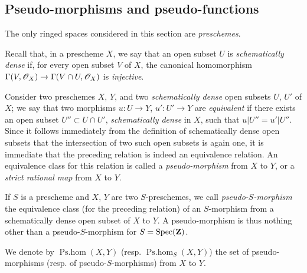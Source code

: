 \subsection{Pseudo-morphisms and pseudo-functions}

The only ringed spaces considered in this section are \emph{preschemes}.

\begin{env}[20.2.1]\label{IV.20.2.1}
Recall  that, in a prescheme $X$, we say that an open subset $U$ is \emph{schematically dense} if, for every open subset $V$ of $X$, the canonical homomorphism $\Gamma(V,\mathscr{O}_X)\to\Gamma(V\cap U,\mathscr{O}_X)$ is \emph{injective}.

Consider two preschemes $X$, $Y$, and two \emph{schematically dense} open subsets $U$, $U'$ of $X$; we say that two morphisms $u:U\to Y$, $u':U'\to Y$ are \emph{equivalent} if there exists an open subset $U''\subset U\cap U'$, \emph{schematically dense} in $X$, such that $u|U''=u'|U''$.
Since it follows immediately from the definition of schematically dense open subsets that the intersection of two such open subsets is again one, it is immediate that the preceding relation is indeed an equivalence relation.
An equivalence class for this relation is called a \emph{pseudo-morphism} from $X$ to $Y$, or a \emph{strict rational map} from $X$ to $Y$.

If $S$ is a prescheme and $X$, $Y$ are two $S$-preschemes, we call \emph{pseudo-$S$-morphism} the equivalence class (for the preceding relation) of an $S$-morphism from a schematically dense open subset of $X$ to $Y$.
A pseudo-morphism is thus nothing other than a pseudo-$S$-morphism for $S=\operatorname{Spec}(\mathbf{Z})$.

We denote by $\operatorname{Ps.hom}(X,Y)$ (resp. $\operatorname{Ps.hom}_S(X,Y)$) the set of pseudo-morphisms (resp. of pseudo-$S$-morphisms) from $X$ to $Y$.
\end{env}

